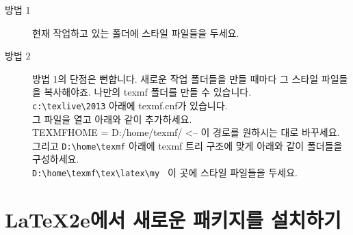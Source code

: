  	\begin{description}
	\item[방법 1]
		현재 작업하고 있는 폴더에 스타일 파일들을 두세요.
	\item[방법 2]
		방법 1의 단점은 뻔합니다. 새로운 작업 폴더들을 만들 때마다 그 스타일 파일들을 복사해야죠.
		나만의 texmf 폴더를 만들 수 있습니다. \\
		\verb|c:\texlive\2013| 아래에 texmf.cnf가 있습니다. \\
		그 파일을 열고 아래와 같이 추가하세요. \\
		TEXMFHOME = D:/home/texmf/  <-- 이 경로를 원하시는 대로 바꾸세요. \\
		그리고 \verb|D:\home\texmf| 아래에 texmf 트리 구조에 맞게 아래와 같이 폴더들을 구성하세요. \\
		\verb|D:\home\texmf\tex\latex\my |
		이 곳에 스타일 파일들을 두세요. 
 	\end{description}
		
		
\newpage
\section{LaTeX2e에서 새로운 패키지를 설치하기}

